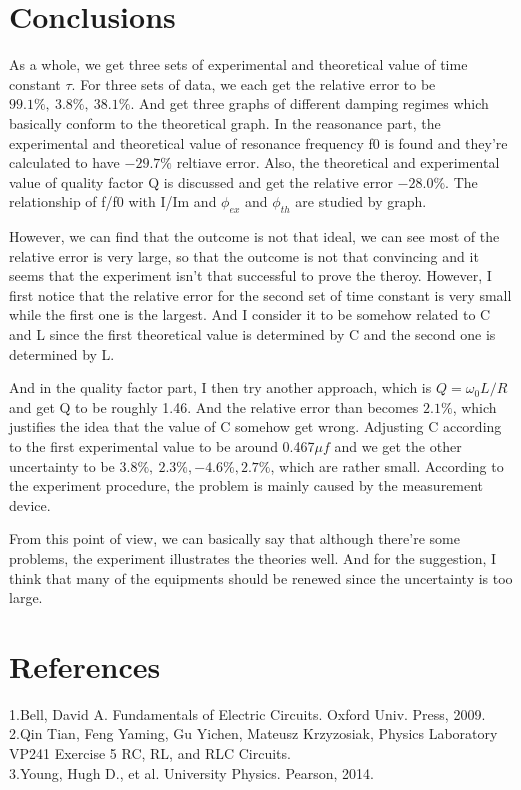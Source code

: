 \documentclass[12pt,a4paper]{article}
\begin{document}
\section{Conclusions}
\qquad As a whole, we get three sets of experimental and theoretical value of time constant $\tau$. For three sets of data, we each get the relative error to be $99.1\%,~3.8\%,~38.1\%$. And get three graphs of different damping regimes which basically conform to the theoretical graph. In the reasonance part, the experimental and theoretical value of resonance frequency f0 is found and they're calculated to have $-29.7\%$ reltiave error. Also, the theoretical and experimental value of quality factor Q is discussed and get the relative error $-28.0\%$. The relationship of f/f0 with I/Im and $\phi_{ex}$ and $\phi_{th}$ are studied by graph.\par
However, we can find that the outcome is not that ideal, we can see most of the relative error is very large, so that the outcome is not that convincing and it seems that the experiment isn't that successful to prove the theroy. However, I first notice that the relative error for the second set of time constant is very small while the first one is the largest. And I consider it to be somehow related to C and L since the first theoretical value is determined by C and the second one is determined by L.\par
And in the quality factor part, I then try another approach, which is $Q=\omega_0 L/R$ and get Q to be roughly 1.46. And the relative error than becomes $2.1\%$, which justifies the idea that the value of C somehow get wrong. Adjusting C according to the first experimental value to be around 0.467$\mu f$ and we get the other uncertainty to be $3.8\%,~2.3\%,-4.6\%,2.7\%$, which are rather small. According to the experiment procedure, the problem is mainly caused by the measurement device.\par
From this point of view, we can basically say that although there're some problems, the experiment illustrates the theories well. And for the suggestion, I think that many of the equipments should be renewed since the uncertainty is too large.




\section{References}
1.Bell, David A. Fundamentals of Electric Circuits. Oxford Univ. Press, 2009.\\
2.Qin Tian, Feng Yaming, Gu Yichen, Mateusz Krzyzosiak, Physics Laboratory VP241 Exercise 5 RC, RL, and RLC Circuits.\\
3.Young, Hugh D., et al. University Physics. Pearson, 2014. 
\end{document}
